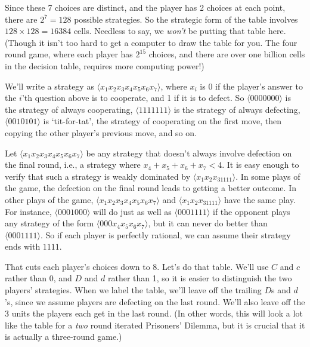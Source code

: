 \documentclass[
  11pt,
  letterpaper,
]{scrbook}
\begin{document}
Since these 7 choices are distinct, and the player has 2 choices at each
point, there are \(2^7 = 128\) possible strategies. So the strategic
form of the table involves \(128 \times 128 = 16384\) cells. Needless to
say, we \emph{won't} be putting that table here. (Though it isn't too
hard to get a computer to draw the table for you. The four round game,
where each player has \(2^{15}\) choices, and there are over one billion
cells in the decision table, requires more computing power!)

We'll write a strategy as \(\langle x_1x_2x_3x_4x_5x_6x_7 \rangle\),
where \(x_i\) is 0 if the player's answer to the \(i\)'th question above
is to cooperate, and 1 if it is to defect. So
\(\langle 0000000 \rangle\) is the strategy of always cooperating,
\(\langle 1111111 \rangle\) is the strategy of always defecting,
\(\langle 0010101 \rangle\) is `tit-for-tat', the strategy of
cooperating on the first move, then copying the other player's previous
move, and so on.

Let \(\langle x_1x_2x_3x_4x_5x_6x_7 \rangle\) be any strategy that
doesn't always involve defection on the final round, i.e., a strategy
where \(x_4 + x_5 + x_6 + x_7 < 4\). It is easy enough to verify that
such a strategy is weakly dominated by
\(\langle x_1x_2x_31111 \rangle\). In some plays of the game, the
defection on the final round leads to getting a better outcome. In other
plays of the game, \(\langle x_1x_2x_3x_4x_5x_6x_7 \rangle\) and
\(\langle x_1x_2x_31111 \rangle\) have the same play. For instance,
\(\langle 0001000 \rangle\) will do just as well as
\(\langle 0001111 \rangle\) if the opponent plays any strategy of the
form \(\langle 000x_4x_5x_6x_7 \rangle\), but it can never do better
than \(\langle 0001111 \rangle\). So if each player is perfectly
rational, we can assume their strategy ends with \(1111\).

That cuts each player's choices down to 8. Let's do that table. We'll
use \(C\) and \(c\) rather than 0, and \(D\) and \(d\) rather than 1, so
it is easier to distinguish the two players' strategies. When we label
the table, we'll leave off the trailing \(D\)s and \(d\)'s, since we
assume players are defecting on the last round. We'll also leave off the
3 units the players each get in the last round. (In other words, this
will look a lot like the table for a \emph{two} round iterated
Prisoners' Dilemma, but it is crucial that it is actually a three-round
game.)
\end{document}
